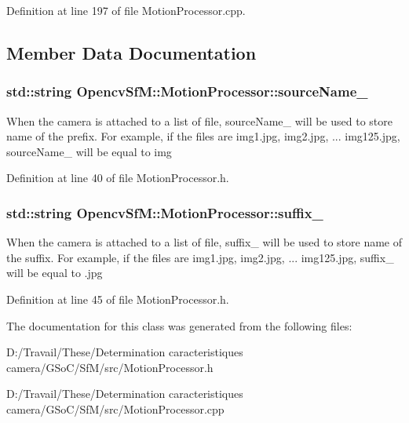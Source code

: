 Definition at line 197 of file MotionProcessor.cpp.



\subsection{Member Data Documentation}
\hypertarget{class_opencv_sf_m_1_1_motion_processor_a9bb3fdc8916e6d6c00a7a81408a6bbfd}{
\subsubsection[{sourceName\_\-}]{\setlength{\rightskip}{0pt plus 5cm}std::string {\bf OpencvSfM::MotionProcessor::sourceName\_\-}}}
\label{class_opencv_sf_m_1_1_motion_processor_a9bb3fdc8916e6d6c00a7a81408a6bbfd}
When the camera is attached to a list of file, sourceName\_\- will be used to store name of the prefix. For example, if the files are img1.jpg, img2.jpg, ... img125.jpg, sourceName\_\- will be equal to img 

Definition at line 40 of file MotionProcessor.h.

\hypertarget{class_opencv_sf_m_1_1_motion_processor_abbf053cdaf47914a5fe9d5c918d81358}{
\subsubsection[{suffix\_\-}]{\setlength{\rightskip}{0pt plus 5cm}std::string {\bf OpencvSfM::MotionProcessor::suffix\_\-}}}
\label{class_opencv_sf_m_1_1_motion_processor_abbf053cdaf47914a5fe9d5c918d81358}
When the camera is attached to a list of file, suffix\_\- will be used to store name of the suffix. For example, if the files are img1.jpg, img2.jpg, ... img125.jpg, suffix\_\- will be equal to .jpg 

Definition at line 45 of file MotionProcessor.h.



The documentation for this class was generated from the following files:\begin{DoxyCompactItemize}
\item 
D:/Travail/These/Determination caracteristiques camera/GSoC/SfM/src/MotionProcessor.h\item 
D:/Travail/These/Determination caracteristiques camera/GSoC/SfM/src/MotionProcessor.cpp\end{DoxyCompactItemize}
